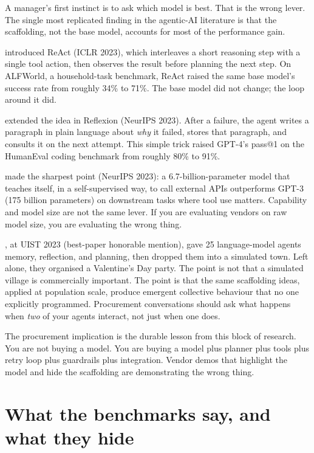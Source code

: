 \documentclass[11pt]{article}
\begin{document}
A manager's first instinct is to ask which model is best. That is the
wrong lever. The single most replicated finding in the agentic-AI
literature is that the scaffolding, not the base model, accounts for
most of the performance gain.

\citet{yao2023react} introduced ReAct (ICLR 2023), which interleaves
a short reasoning step with a single tool action, then observes the
result before planning the next step. On ALFWorld, a household-task
benchmark, ReAct raised the same base model's success rate from
roughly 34\% to 71\%. The base model did not change; the loop around
it did.

\citet{shinn2023reflexion} extended the idea in Reflexion (NeurIPS
2023). After a failure, the agent writes a paragraph in plain
language about \emph{why} it failed, stores that paragraph, and
consults it on the next attempt. This simple trick raised GPT-4's
pass@1 on the HumanEval coding benchmark from roughly 80\% to 91\%.

\citet{schick2023toolformer} made the sharpest point (NeurIPS 2023):
a 6.7-billion-parameter model that teaches itself, in a self-supervised
way, to call external APIs outperforms GPT-3 (175 billion parameters)
on downstream tasks where tool use matters. Capability and model size
are not the same lever. If you are evaluating vendors on raw model
size, you are evaluating the wrong thing.

\citet{park2023generative}, at UIST 2023 (best-paper honorable
mention), gave 25 language-model agents memory, reflection, and
planning, then dropped them into a simulated town. Left alone, they
organised a Valentine's Day party. The point is not that a simulated
village is commercially important. The point is that the same
scaffolding ideas, applied at population scale, produce emergent
collective behaviour that no one explicitly programmed. Procurement
conversations should ask what happens when \emph{two} of your agents
interact, not just when one does.

The procurement implication is the durable lesson from this block of
research. You are not buying a model. You are buying a model plus
planner plus tools plus retry loop plus guardrails plus integration.
Vendor demos that highlight the model and hide the scaffolding are
demonstrating the wrong thing.

\section{What the benchmarks say, and what they hide}
\end{document}
